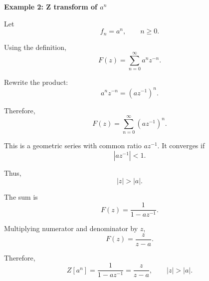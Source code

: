 \begin{examplebox}
    \textbf{Example 2: Z transform of $a^n$}

    Let
    \[
        f_n=a^n, \qquad n\geq 0.
    \]

    Using the definition,
    \[
        F(z)=\sum_{n=0}^{\infty}a^nz^{-n}.
    \]

    Rewrite the product:
    \[
        a^nz^{-n}=(az^{-1})^n.
    \]

    Therefore,
    \[
        F(z)=\sum_{n=0}^{\infty}(az^{-1})^n.
    \]

    This is a geometric series with common ratio $az^{-1}$. It converges if
    \[
        |az^{-1}|<1.
    \]

    Thus,
    \[
        |z|>|a|.
    \]

    The sum is
    \[
        F(z)=\frac{1}{1-az^{-1}}.
    \]

    Multiplying numerator and denominator by $z$,
    \[
        F(z)=\frac{z}{z-a}.
    \]

    Therefore,
    \[
        \boxed{
            Z[a^n]=\frac{1}{1-az^{-1}}=\frac{z}{z-a}, \qquad |z|>|a|.
        }
    \]
\end{examplebox}

